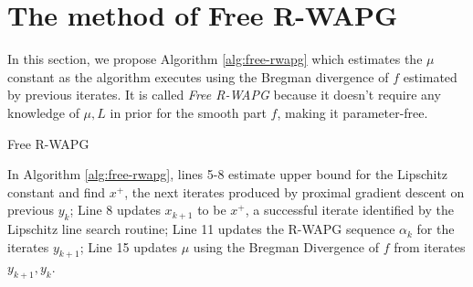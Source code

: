 \documentclass[12pt]{article}
\begin{document}
\section{The method of Free R-WAPG}\label{sec:free-rwapg}
    In this section, we propose Algorithm \ref{alg:free-rwapg} which estimates the $\mu$ constant as the algorithm executes using the Bregman divergence of $f$ estimated by previous iterates.
    It is called \emph{Free R-WAPG} because it doesn't require any knowledge of $\mu, L$ in prior for the smooth part $f$, making it parameter-free.
    \begin{algorithm}
        \begin{algorithmic}[1]
        {\footnotesize
            \ENDWHILE
        \ENDFOR
        }
        \end{algorithmic}
        \caption{Free R-WAPG}
        \label{alg:free-rwapg}
    \end{algorithm}
    \par
    In Algorithm \ref{alg:free-rwapg}, lines 5-8 estimate
    upper bound for the Lipschitz constant and find $x^+$, the next iterates produced by proximal gradient descent on previous $y_k$;
    Line 8 updates $x_{k + 1}$ to be $x^+$, a successful iterate identified by the Lipschitz line search routine;
    Line 11 updates the R-WAPG sequence $\alpha_k$ for the iterates $y_{k + 1}$;
    Line 15 updates $\mu$ using the Bregman Divergence of $f$ from iterates $y_{k + 1}, y_k$.
    \par
\end{document}

